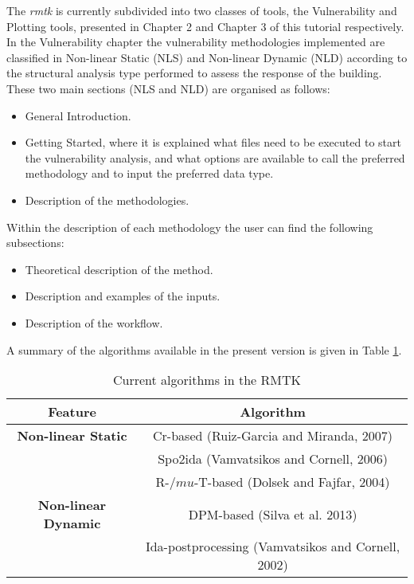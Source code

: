The \textit{rmtk} is currently subdivided into two classes of tools, the Vulnerability and Plotting tools, presented in Chapter 2 and Chapter 3 of this tutorial respectively. In the Vulnerability chapter the vulnerability methodologies implemented are classified in Non-linear Static (NLS) and Non-linear Dynamic (NLD) according to the structural analysis type performed to assess the response of the building. These two main sections (NLS and NLD) are organised as follows:

\begin{itemize}
\item General Introduction.
\item Getting Started, where it is explained what files need to be executed to start the vulnerability analysis, and what options are available to call the preferred methodology and to input the preferred data type.
\item Description of the methodologies.
\end{itemize}

Within the description of each methodology the user can find the following subsections:
\begin{itemize}
\item Theoretical description of the method.
\item Description and examples of the inputs.
\item Description of the workflow.
\end{itemize}

A summary of the algorithms available in the present version is given in Table \ref{tab:current_features}.
\begin{table}[!htbp]
\centering
\begin{tabular}{|c|c|} \hline
Feature & Algorithm\\ \hline
\textbf{Non-linear Static} & Cr-based (Ruiz-Garcia and Miranda, 2007)\\
    & Spo2ida (Vamvatsikos and Cornell, 2006) \\
    & R-$/mu$-T-based (Dolsek and Fajfar, 2004) \\ \hline
 \textbf{Non-linear Dynamic} & DPM-based (Silva et al. 2013)\\
  & Ida-postprocessing (Vamvatsikos and Cornell, 2002) \\ \hline
\end{tabular}
\caption{Current algorithms in the RMTK}
\label{tab:current_features}
\end{table}

